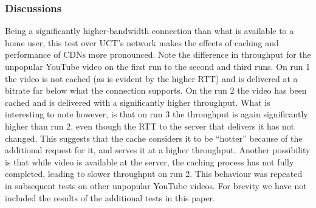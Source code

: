 \documentclass{sig-alternate-05-2015}
\begin{document}
\begin{table}
	\centering
	\caption{Throughput using UCT network (KB/s) - Test 2}
	\label{table:UCTThroughput-TestCase2}
\end{table}

\subsubsection{Discussions}
Being a significantly higher-bandwidth connection than what is available to a home user, this test over UCT's network makes the effects of caching and performance of CDNs more pronounced. Note the difference in throughput for the unpopular YouTube video on the first run to the second and third runs. On run 1 the video is not cached (as is evident by the higher RTT) and is delivered at a bitrate far below what the connection supports. On the run 2 the video has been cached and is delivered with a significantly higher throughput. What is interesting to note however, is that on run 3 the throughput is again significantly higher than run 2, even though the RTT to the server that delivers it has not changed. This suggests that the cache considers it to be ``hotter'' because of the additional request for it, and serves it at a higher throughput. Another possibility is that while video is available at the server, the caching process has not fully completed, leading to slower throughput on run 2. This behaviour was repeated in subsequent tests on other unpopular YouTube videos. For brevity we have not included the results of the additional tests in this paper.
\end{document}
